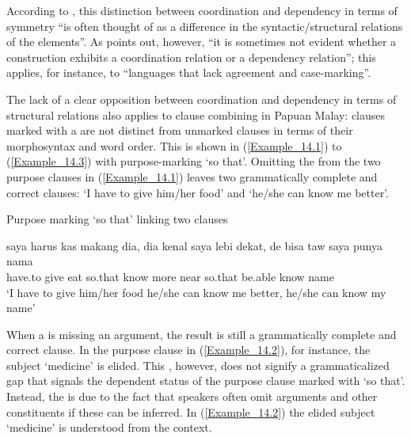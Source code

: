 According to \citet[46]{Haspelmath.2007c}, this distinction between coordination and dependency in terms of symmetry “is often thought of as a difference in the syntactic/structural relations of the elements”. As \citet[46]{Haspelmath.2007c} points out, however, “it is sometimes not evident whether a construction exhibits a coordination relation or a dependency relation”; this applies, for instance, to “languages that lack agreement and case-marking”.

The lack of a clear opposition between coordination and dependency in terms of structural relations also applies to clause combining in Papuan Malay: clauses marked with a  are not distinct from unmarked clauses in terms of their morphosyntax and word order. This is shown in (\ref{Example_14.1}) to (\ref{Example_14.3}) with purpose-marking  ‘so that’. Omitting the  from the two purpose clauses in (\ref{Example_14.1}) leaves two grammatically complete and correct clauses:  ‘I have to give him/her food’ and  ‘he/she can know me better’.
%


\begin{styleExampleTitle}
Purpose marking  ‘so that’ linking two clauses
\end{styleExampleTitle}
\ea
\label{Example_14.1}
\gll   saya harus kas makang dia,  dia kenal saya lebi   dekat,  de bisa taw saya punya nama\\
   have.to give eat  so.that  know  more   near so.that  be.able know   name\\
\glt ‘I have to give him/her food  he/she can know me better,  he/she can know my name’ \textstyleExampleSource{[080919-004-NP.0079]}
\z


When a  is missing an argument, the result is still a grammatically complete and correct clause. In the purpose clause in (\ref{Example_14.2}), for instance, the subject  ‘medicine’ is elided. This , however, does not signify a grammaticalized gap that signals the dependent status of the purpose clause marked with  ‘so that’. Instead, the  is due to the fact that speakers often omit arguments and other constituents if these can be inferred. In (\ref{Example_14.2}) the elided subject  ‘medicine’ is understood from the context.


